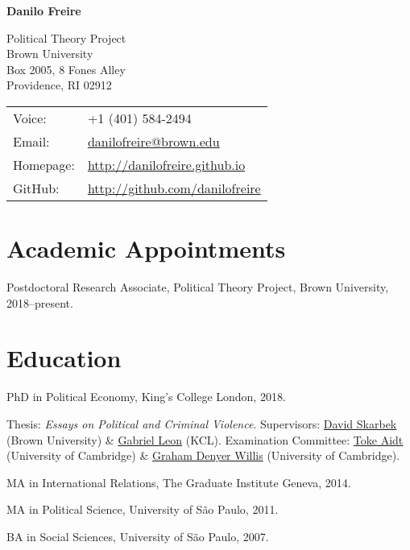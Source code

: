 \documentclass[a4paper]{article}
\def\name{Danilo Freire}
\renewenvironment{itemize}{
	\begin{list}{}{
			\setlength{\leftmargin}{1.5em}
		}
		}{
	\end{list}
}
\begin{document}
{\huge \bf \name}


\vspace{0.25in}

\begin{minipage}{0.45\linewidth}
	Political Theory Project \\
	Brown University \\
	Box 2005, 8 Fones Alley \\
	Providence, RI 02912
\end{minipage}
\begin{minipage}{0.45\linewidth}
	\begin{tabular}{ll}
		Voice: & +1 (401) 584-2494 \\
		Email:          & \href{mailto:danilofreire@brown.edu}{danilofreire@brown.edu}          \\
		Homepage:       & \href{http://danilofreire.github.io/}{http://danilofreire.github.io}   \\
		GitHub:         & \href{http://github.com/danilofreire}{http://github.com/danilofreire}
	\end{tabular}
	\end{minipage}

	\section*{Academic Appointments}

	\begin{itemize}
		\item Postdoctoral Research Associate, Political Theory Project, Brown University, 2018--present.
	\end{itemize}

	\section*{Education}

	\begin{itemize}
		\item PhD in Political Economy, King's College London, 2018.
			\begin{itemize}
				\item Thesis: \textit{Essays on Political and Criminal Violence}. Supervisors: \href{http://davidskarbek.com}{David Skarbek} (Brown University) \& \href{https://gabrieljleon.wordpress.com/}{Gabriel Leon} (KCL). Examination Committee: \href{http://www.econ.cam.ac.uk/people/faculty/tsa23}{Toke Aidt} (University of Cambridge) \& \href{http://www.grahamdenyerwillis.com}{Graham Denyer Willis} (University of Cambridge).
			\end{itemize}
		\item MA in International Relations, The Graduate Institute Geneva, 2014.
		\item MA in Political Science, University of São Paulo, 2011.
		\item BA in Social Sciences, University of São Paulo, 2007.
	\end{itemize}
\end{document}
